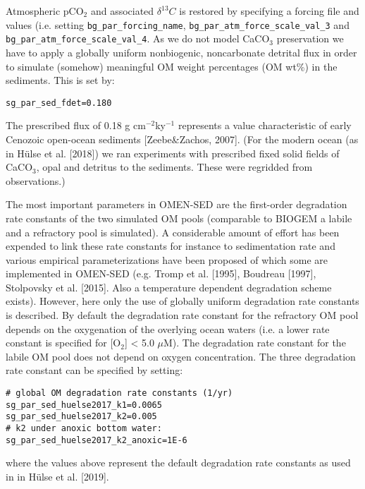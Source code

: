 \documentclass[11pt,fleqn]{book} %
\begin{document}
Atmospheric pCO$_2$ and associated \(\delta^{13}C\) is restored by specifying a forcing file and values (i.e. setting  \texttt{bg\_par\_forcing\_name}, \texttt{bg\_par\_atm\_force\_scale\_val\_3} and \texttt{bg\_par\_atm\_force\_scale\_val\_4}. 
As we do not model CaCO$_3$ preservation we have to apply a globally uniform nonbiogenic, noncarbonate detrital flux in order to simulate (somehow) meaningful OM weight percentages (OM wt\%) in the sediments. This is set by:
\vspace{-1mm}\begin{verbatim}
sg_par_sed_fdet=0.180
\end{verbatim}\vspace{-1mm}
The prescribed flux of 0.18 g cm$^{-2}$ky$^{-1}$ represents a value characteristic of early Cenozoic open-ocean sediments [Zeebe\&Zachos, 2007]. (For the modern ocean (as in H\"ulse et al. [2018]) we ran experiments with prescribed fixed solid 
fields of CaCO$_3$, opal and detritus to the sediments. These were regridded from observations.) 

The most important parameters in OMEN-SED are the first-order degradation rate constants of the two simulated OM pools (comparable to BIOGEM a labile and a refractory pool is simulated). A considerable amount of effort has been expended to link these rate 
constants for instance to sedimentation rate and various empirical parameterizations have been proposed of which some are implemented in OMEN-SED (e.g. Tromp et al. [1995], Boudreau [1997], Stolpovsky et al. [2015]. Also a temperature dependent 
degradation scheme exists). However, here only the use of globally uniform degradation rate constants is described. By default the degradation rate constant for the refractory OM pool depends on the oxygenation of the overlying ocean waters 
(i.e. a lower rate constant is specified for [O$_2$] < 5.0 $\mu$M). The degradation rate constant for the labile OM pool does not depend on oxygen concentration. The three degradation rate constant can be specified by setting:
\vspace{-1mm}\begin{verbatim}
# global OM degradation rate constants (1/yr)
sg_par_sed_huelse2017_k1=0.0065
sg_par_sed_huelse2017_k2=0.005
# k2 under anoxic bottom water:
sg_par_sed_huelse2017_k2_anoxic=1E-6
\end{verbatim}\vspace{-1mm}
where the values above represent the default degradation rate constants as used in in H\"ulse et al. [2019].
\end{document}
